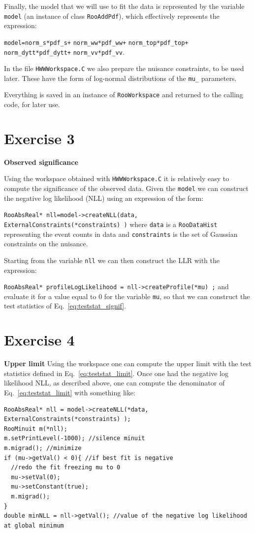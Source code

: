 \documentclass[a4paper,12pt]{article}
\begin{document}
Finally, the model that we will use to fit the data is represented by the
variable \verb+model+ (an instance of class \verb!RooAddPdf!), which effectively represents the expression:

\verb!model=norm_s*pdf_s+! 
\verb!norm_ww*pdf_ww+! 
\verb!norm_top*pdf_top+!\\ 
\verb!norm_dytt*pdf_dytt+! 
\verb!norm_vv*pdf_vv!.

In the file \verb+HWWWorkspace.C+ we also prepare the nuisance constraints, to
be used later. These have the form of log-normal distributions of the \verb+mu_+
parameters.

Everything is saved in an instance of \verb+RooWorkspace+ and returned to the
calling code, for later use.

\section*{Exercise 3}
{\bf Observed significance}

Using the workspace obtained with \verb+HWWWorkspace.C+ it is relatively easy
to compute the significance of the observed data.
Given the \verb+model+ we can construct the negative log likelihood (NLL) using an expression of
the form:

\verb+RooAbsReal* nll=model->createNLL(data, ExternalConstraints(*constraints) )+
where \verb+data+ is a \verb!RooDataHist! representing the event counts in data
and \verb+constraints+ is the set of Gaussian constraints on the nuisance.

Starting from the variable \verb+nll+ we can then construct the LLR with the
expression:

\verb+RooAbsReal* profileLogLikelihood = nll->createProfile(*mu) ;+
and evaluate it for a value equal to 0 for the variable \verb+mu+, so that we
can construct the test statistics of Eq.~\ref{eq:teststat_signif}.


\section*{Exercise 4}
{\bf Upper limit}
Using the workspace one can compute the upper limit with the test statistics
defined in Eq.~\ref{eq:teststat_limit}.
Once one had the negative log likelihood NLL, as described above, one can
compute the denominator of Eq.~\ref{eq:teststat_limit} with something like:

\begin{lstlisting}
RooAbsReal* nll = model->createNLL(*data, ExternalConstraints(*constraints) );
RooMinuit m(*nll);
m.setPrintLevel(-1000); //silence minuit
m.migrad(); //minimize
if (mu->getVal() < 0){ //if best fit is negative
  //redo the fit freezing mu to 0
  mu->setVal(0);
  mu->setConstant(true);
  m.migrad();
}
double minNLL = nll->getVal(); //value of the negative log likelihood at global minimum
\end{lstlisting}
\end{document}
